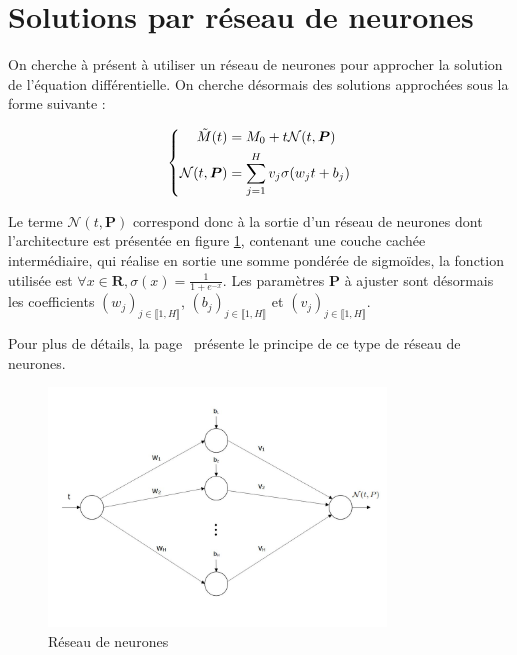 \documentclass[12pt]{report}
\begin{document}
\section{Solutions par réseau de neurones}

On cherche à présent à utiliser un réseau de neurones pour approcher la solution de l'équation différentielle. On cherche désormais des solutions approchées sous la forme suivante :

\begin{equation}
    \left\{
    \begin{aligned}
        \Tilde{M}(t)            & = M_0 + t{\mathcal{N}}(t,\bm{P})      \\
        {\mathcal{N}}(t,\bm{P}) & = \sum_{j=1}^{H} v_j \sigma(w_jt+b_j)
    \end{aligned}
    \right.
    \label{eq:solution_NN}
\end{equation}

Le terme ${\mathcal{N}}(t,\bm{P})$ correspond donc à la sortie d'un réseau de neurones dont l'architecture est présentée en figure \ref{fig:NN}, contenant une couche cachée intermédiaire, qui réalise en sortie une somme pondérée de sigmoïdes, la fonction utilisée est ${\displaystyle{\forall x \in \mathbf{R}, \sigma(x) = \frac{1}{1+e^{-x}}}}$.
Les paramètres $\bm{P}$ à ajuster sont désormais les coefficients $(w_j)_{j\in \llbracket 1,H \rrbracket}$, $(b_j)_{j\in \llbracket 1,H \rrbracket}$ et $(v_j)_{j\in \llbracket 1,H \rrbracket}$.

Pour plus de détails, la page~\cite{WikiNN} présente le principe de ce type de réseau de neurones.
\begin{figure}
    \centering
    \includegraphics[width=0.8\textwidth]{NN.jpg}
    \caption{Réseau de neurones}
    \label{fig:NN}
\end{figure}
\end{document}
